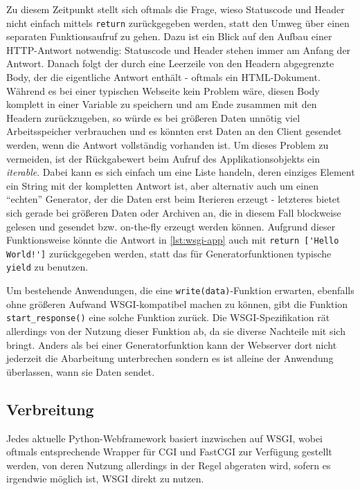 Zu diesem Zeitpunkt stellt sich oftmals die Frage, wieso Statuscode und Header nicht einfach mittels
\lstinline{return} zurückgegeben werden, statt den Umweg über einen separaten Funktionsaufruf zu
gehen. Dazu ist ein Blick auf den Aufbau einer HTTP-Antwort notwendig: Statuscode und Header stehen
immer am Anfang der Antwort. Danach folgt der durch eine Leerzeile von den Headern abgegrenzte Body,
der die eigentliche Antwort enthält - oftmals ein HTML-Dokument. Während es bei einer
typischen Webseite kein Problem wäre, diesen Body komplett in einer Variable zu speichern und am
Ende zusammen mit den Headern zurückzugeben, so würde es bei größeren Daten unnötig viel
Arbeitsspeicher verbrauchen und es könnten erst Daten an den Client gesendet werden, wenn die
Antwort vollständig vorhanden ist. Um dieses Problem zu vermeiden, ist der Rückgabewert beim Aufruf
des Applikationsobjekts ein \emph{iterable}. Dabei kann es sich einfach um eine Liste handeln, deren
einziges Element ein String mit der kompletten Antwort ist, aber alternativ auch um einen
\enquote{echten} Generator, der die Daten erst beim Iterieren erzeugt - letzteres bietet sich gerade
bei größeren Daten oder Archiven an, die in diesem Fall blockweise gelesen und gesendet bzw.
on-the-fly erzeugt werden können. Aufgrund dieser Funktionsweise könnte die Antwort in
\autoref{lst:wsgi-app} auch mit \lstinline{return ['Hello World!']} zurückgegeben werden, statt das
für Generatorfunktionen typische \lstinline{yield} zu benutzen.

Um bestehende Anwendungen, die eine \lstinline{write(data)}-Funktion erwarten, ebenfalls ohne
größeren Aufwand WSGI-kompatibel machen zu können, gibt die Funktion \lstinline{start_response()}
eine solche Funktion zurück. Die WSGI-Spezifikation rät allerdings von der Nutzung dieser Funktion
ab, da sie diverse Nachteile mit sich bringt. Anders als bei einer Generatorfunktion kann der
Webserver dort nicht jederzeit die Abarbeitung unterbrechen sondern es ist alleine der Anwendung
überlassen, wann sie Daten sendet.


\subsection{Verbreitung}

Jedes aktuelle Python-Webframework basiert inzwischen auf WSGI, wobei oftmals entsprechende Wrapper
für CGI und FastCGI zur Verfügung gestellt werden, von deren Nutzung allerdings in der Regel
abgeraten wird, sofern es irgendwie möglich ist, WSGI direkt zu nutzen.

